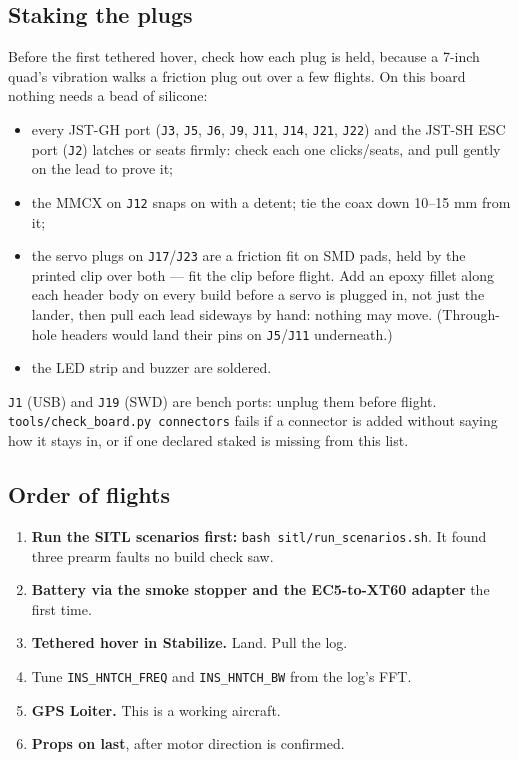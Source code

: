 \documentclass[11pt,a4paper]{article}
\newcommand{\file}[1]{\texttt{\small #1}}
\newcommand{\cmd}[1]{\texttt{\small #1}}
\begin{document}
\subsection{Staking the plugs}

Before the first tethered hover, check how each plug is held, because a 7-inch quad's
vibration walks a friction plug out over a few flights. On this board nothing needs a bead
of silicone:

\begin{itemize}
\item every JST-GH port (\file{J3}, \file{J5}, \file{J6}, \file{J9}, \file{J11}, \file{J14},
\file{J21}, \file{J22}) and the JST-SH ESC port (\file{J2}) latches or seats firmly: check each one clicks/seats, and pull
gently on the lead to prove it;
\item the MMCX on \file{J12} snaps on with a detent; tie the coax down 10--15 mm from it;
\item the servo plugs on \file{J17}/\file{J23} are a friction fit on SMD pads, held by the
printed clip over both --- fit the clip before flight. Add an epoxy fillet along each header body
on every build before a servo is plugged in, not just the lander, then pull each lead sideways by hand:
nothing may move. (Through-hole headers would land their pins on \file{J5}/\file{J11} underneath.)
\item the LED strip and buzzer are soldered.
\end{itemize}

\file{J1} (USB) and \file{J19} (SWD) are bench ports: unplug them before flight.
\file{tools/check\_board.py connectors} fails if a connector is added without saying how it stays
in, or if one declared staked is missing from this list.

\subsection{Order of flights}

\begin{enumerate}
\item \textbf{Run the SITL scenarios first:} \cmd{bash sitl/run\_scenarios.sh}. It found
three prearm faults no build check saw.
\item \textbf{Battery via the smoke stopper and the EC5-to-XT60 adapter} the first time.
\item \textbf{Tethered hover in Stabilize.} Land. Pull the log.
\item Tune \file{INS\_HNTCH\_FREQ} and \file{INS\_HNTCH\_BW} from the log's FFT.
\item \textbf{GPS Loiter.} This is a working aircraft.
\item \textbf{Props on last}, after motor direction is confirmed.
\end{enumerate}
\end{document}
